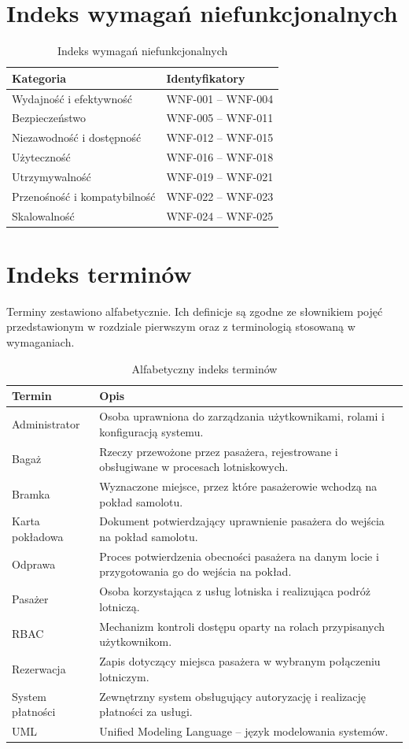 \documentclass[12pt,a4paper,oneside]{report}
\begin{document}
\section{Indeks wymagań niefunkcjonalnych}
\begin{longtable}{|p{5cm}|p{8cm}|}
\caption{Indeks wymagań niefunkcjonalnych}\label{tab:indeks-wnf}\\\hline
\rowcolor{lightblue}\textbf{Kategoria} & \textbf{Identyfikatory}\\\hline
Wydajność i efektywność & WNF-001 -- WNF-004\\\hline
Bezpieczeństwo & WNF-005 -- WNF-011\\\hline
Niezawodność i dostępność & WNF-012 -- WNF-015\\\hline
Użyteczność & WNF-016 -- WNF-018\\\hline
Utrzymywalność & WNF-019 -- WNF-021\\\hline
Przenośność i kompatybilność & WNF-022 -- WNF-023\\\hline
Skalowalność & WNF-024 -- WNF-025\\\hline
\end{longtable}


\section{Indeks terminów}
Terminy zestawiono alfabetycznie. Ich definicje są zgodne ze słownikiem pojęć
przedstawionym w rozdziale pierwszym oraz z terminologią stosowaną w wymaganiach.

\begin{longtable}{|p{4.2cm}|p{9.3cm}|}
\caption{Alfabetyczny indeks terminów}\label{tab:indeks-terminow}\\\hline
\rowcolor{lightblue}\textbf{Termin} & \textbf{Opis}\\\hline
Administrator & Osoba uprawniona do zarządzania użytkownikami, rolami i konfiguracją systemu.\\\hline
Bagaż & Rzeczy przewożone przez pasażera, rejestrowane i obsługiwane w procesach lotniskowych.\\\hline
Bramka & Wyznaczone miejsce, przez które pasażerowie wchodzą na pokład samolotu.\\\hline
Karta pokładowa & Dokument potwierdzający uprawnienie pasażera do wejścia na pokład samolotu.\\\hline
Odprawa & Proces potwierdzenia obecności pasażera na danym locie i przygotowania go do wejścia na pokład.\\\hline
Pasażer & Osoba korzystająca z usług lotniska i realizująca podróż lotniczą.\\\hline
RBAC & Mechanizm kontroli dostępu oparty na rolach przypisanych użytkownikom.\\\hline
Rezerwacja & Zapis dotyczący miejsca pasażera w wybranym połączeniu lotniczym.\\\hline
System płatności & Zewnętrzny system obsługujący autoryzację i realizację płatności za usługi.\\\hline
UML & Unified Modeling Language -- język modelowania systemów.\\\hline
\end{longtable}
\end{document}
